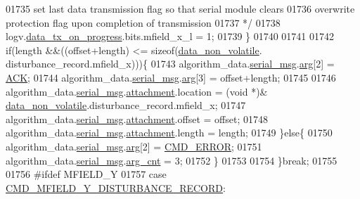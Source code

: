 \begin{DoxyCode}
{{{{{01735 \textcolor{comment}{                         set last data transmission flag so that serial module clears}
01736 \textcolor{comment}{                         overwrite protection flag upon completion of transmission}
01737 \textcolor{comment}{                       */}
01738                         logv.\hyperlink{a00021_a6cdefde69642ef511e3252c38be68516}{data\_tx\_on\_progress}.bits.mfield\_x\_l = 1;
01739                     \}
01740 
01741 
01742                    \textcolor{keywordflow}{if}(length &&((offset+length) <= \textcolor{keyword}{sizeof}(\hyperlink{a00060_a76ac5f917f5308dcd83de0d7c94559fb}{data\_non\_volatile}.
      disturbance\_record.mfield\_x)))\{
01743                        algorithm\_data.\hyperlink{a00016_afcf5f557aea688aad985eec15269c1da}{serial\_msg}.\hyperlink{a00031_af7d6f762438c80072bd9dc0e4dd4ae1e}{arg}[2]                 = 
      \hyperlink{a00021_a6f6489887e08bff4887d0bc5dcf214d8}{ACK};
01744                        algorithm\_data.\hyperlink{a00016_afcf5f557aea688aad985eec15269c1da}{serial\_msg}.\hyperlink{a00031_af7d6f762438c80072bd9dc0e4dd4ae1e}{arg}[3]                 = offset+length;
01745 
01746                        algorithm\_data.\hyperlink{a00016_afcf5f557aea688aad985eec15269c1da}{serial\_msg}.\hyperlink{a00031_a040f6d5d58d18d8aeaf447eda7f50172}{attachment}.location    = (\textcolor{keywordtype}{void} *)&
      \hyperlink{a00060_a76ac5f917f5308dcd83de0d7c94559fb}{data\_non\_volatile}.disturbance\_record.mfield\_x;
01747                        algorithm\_data.\hyperlink{a00016_afcf5f557aea688aad985eec15269c1da}{serial\_msg}.\hyperlink{a00031_a040f6d5d58d18d8aeaf447eda7f50172}{attachment}.offset      = offset;
01748                        algorithm\_data.\hyperlink{a00016_afcf5f557aea688aad985eec15269c1da}{serial\_msg}.\hyperlink{a00031_a040f6d5d58d18d8aeaf447eda7f50172}{attachment}.length      = length;
01749                      \}\textcolor{keywordflow}{else}\{
01750                          algorithm\_data.\hyperlink{a00016_afcf5f557aea688aad985eec15269c1da}{serial\_msg}.\hyperlink{a00031_af7d6f762438c80072bd9dc0e4dd4ae1e}{arg}[2]               = 
      \hyperlink{a00021_a1764a522e9c1a59a59be8757c69fa494}{CMD\_ERROR};
01751                          algorithm\_data.\hyperlink{a00016_afcf5f557aea688aad985eec15269c1da}{serial\_msg}.\hyperlink{a00031_a7b79f40e2eeec288091afd340bf8f591}{arg\_cnt}              = 3;
01752                      \}
01753 
01754                 \}\textcolor{keywordflow}{break};
01755 
01756 \textcolor{preprocessor}{#ifdef MFIELD\_Y}
01757                 \textcolor{keywordflow}{case}  \hyperlink{a00021_af77e9c0ad32b3cc50d61992d4b64a831}{CMD\_MFIELD\_Y\_DISTURBANCE\_RECORD}:
}}}}}
\end{DoxyCode}
